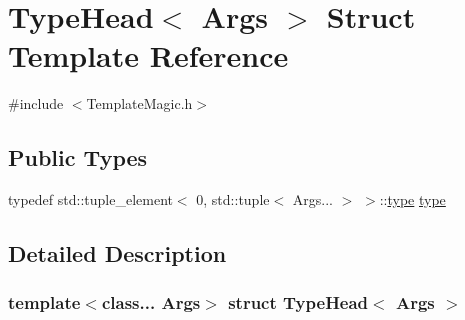 \hypertarget{struct_type_head}{}\section{Type\+Head$<$ Args $>$ Struct Template Reference}
\label{struct_type_head}


{\ttfamily \#include $<$Template\+Magic.\+h$>$}

\subsection*{Public Types}
\begin{DoxyCompactItemize}
\item 
typedef std\+::tuple\+\_\+element$<$ 0, std\+::tuple$<$ Args... $>$ $>$\+::\hyperlink{struct_type_head_a9595415877619fea585771991836e9a2}{type} \hyperlink{struct_type_head_a9595415877619fea585771991836e9a2}{type}
\end{DoxyCompactItemize}


\subsection{Detailed Description}
\subsubsection*{template$<$class... Args$>$\newline
struct Type\+Head$<$ Args $>$}


